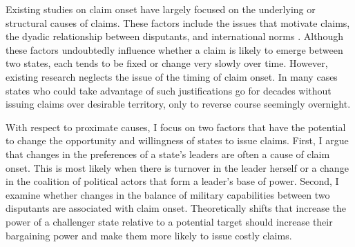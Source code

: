 

Existing studies on claim onset have largely focused on the underlying or structural causes of claims. These factors include the issues that motivate claims, the dyadic relationship between disputants, and international norms \citep[e.g.,][]{abramson2015, burghardt1973, carter2011, englebert2002, goemans2016, huth2009, murphy1990, schultz2015}. Although these factors undoubtedly influence whether a claim is likely to emerge between two states, each tends to be fixed or change very slowly over time. However, existing research neglects the issue of the timing of claim onset. In many cases states who could take advantage of such justifications go for decades without issuing claims over desirable territory, only to reverse course seemingly overnight. 





With respect to proximate causes, I focus on two factors that have the potential to change the opportunity and willingness of states to issue claims. First, I argue that changes in the preferences of a state’s leaders are often a cause of claim onset. This is most likely when there is turnover in the leader herself or a change in the coalition of political actors that form a leader’s base of power. Second, I examine whether changes in the balance of military capabilities between two disputants are associated with claim onset. Theoretically shifts that increase the power of a challenger state relative to a potential target should increase their bargaining power and make them more likely to issue costly claims. 

